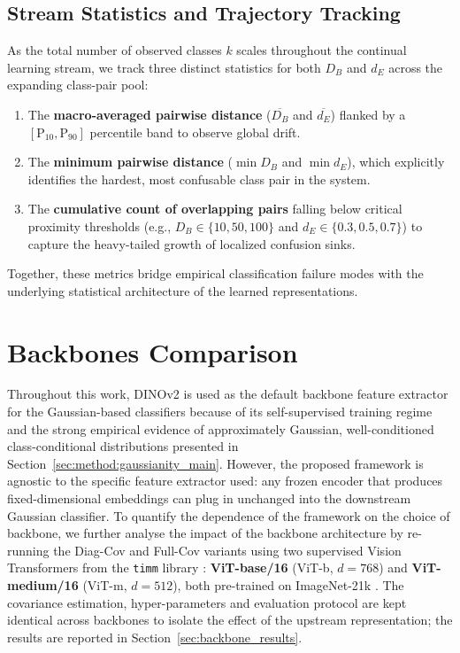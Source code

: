 \subsection{Stream Statistics and Trajectory Tracking}
\label{sec:method:separability:tracking}

As the total number of observed classes $k$ scales throughout the continual learning stream, we track three distinct statistics for both $D_B$ and $d_E$ across the expanding class-pair pool:
\begin{enumerate}
	\item[(a)] The \textbf{macro-averaged pairwise distance} ($\overline{D_B}$ and $\overline{d_E}$) flanked by a $[\mathrm{P}_{10},\mathrm{P}_{90}]$ percentile band to observe global drift.
	\item[(b)] The \textbf{minimum pairwise distance} ($\min D_B$ and $\min d_E$), which explicitly identifies the hardest, most confusable class pair in the system.
	\item[(c)] The \textbf{cumulative count of overlapping pairs} falling below critical proximity thresholds (e.g., $D_B \in \{10, 50, 100\}$ and $d_E \in \{0.3, 0.5, 0.7\}$) to capture the heavy-tailed growth of localized confusion sinks.
\end{enumerate}
Together, these metrics bridge empirical classification failure modes with the underlying statistical architecture of the learned representations.

\section{Backbones Comparison}
\label{sec:method:backbones}

Throughout this work, DINOv2 \cite{oquab2024dinov} is used as the default backbone feature extractor for the Gaussian-based classifiers because of its self-supervised training regime and the strong empirical evidence of approximately Gaussian, well-conditioned class-conditional distributions presented in Section~\ref{sec:method:gaussianity_main}. However, the proposed framework is agnostic to the specific feature extractor used: any frozen encoder that produces fixed-dimensional embeddings can plug in unchanged into the downstream Gaussian classifier. To quantify the dependence of the framework on the choice of backbone, we further analyse the impact of the backbone architecture by re-running the Diag-Cov and Full-Cov variants using two supervised Vision Transformers from the \texttt{timm} library \cite{rw2019timm}: \textbf{ViT-base/16} (ViT-b, $d=768$) and \textbf{ViT-medium/16} (ViT-m, $d=512$), both pre-trained on ImageNet-21k \cite{imagenet21k}. The covariance estimation, hyper-parameters and evaluation protocol are kept identical across backbones to isolate the effect of the upstream representation; the results are reported in Section~\ref{sec:backbone_results}.

